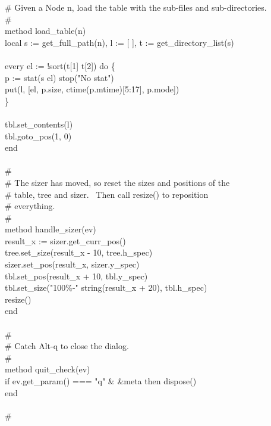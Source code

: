 {\>\# Given a Node n, load the table with the sub-files and sub-directories.\\
\>\# \\
\>method load\_table(n) \\
\>\>local s := get\_full\_path(n), l := [ ], t := get\_directory\_list(s) \\
\\
\>\>every el := !sort(t[1] {\textbar}{\textbar}{\textbar} t[2]) do \{ \\
\>\>\>p := stat(s {\textbar}{\textbar} el) {\textbar} stop("No stat") \\
\>\>\>put(l, [el, p.size, ctime(p.mtime)[5:17], p.mode]) \\
\>\>\>\} \\
\ \\
\>\>tbl.set\_contents(l) \\
\>\>tbl.goto\_pos(1, 0) \\
\>end \\
\ \\
\>\# \\
\>\# The sizer has moved, so reset the sizes and positions of the \\
\>\# table, tree and sizer. \ Then call resize() to reposition \\
\>\# everything. \\
\>\# \\
\>method handle\_sizer(ev) \\
\>\>result\_x := sizer.get\_curr\_pos() \\
\>\>tree.set\_size(result\_x - 10, tree.h\_spec) \\
\>\>sizer.set\_pos(result\_x, sizer.y\_spec) \\
\>\>tbl.set\_pos(result\_x + 10, tbl.y\_spec) \\
\>\>tbl.set\_size("100\%-" {\textbar}{\textbar} string(result\_x + 20), tbl.h\_spec) \\
\>\>resize() \\
\>end \\
\ \\
\>\# \\
\>\# Catch Alt-q to close the dialog. \\
\>\# \\
\>method quit\_check(ev) \\
\>\>if ev.get\_param() === "q" \& \&meta then dispose() \\
\>end \\
\ \\
\>\# \\
}
